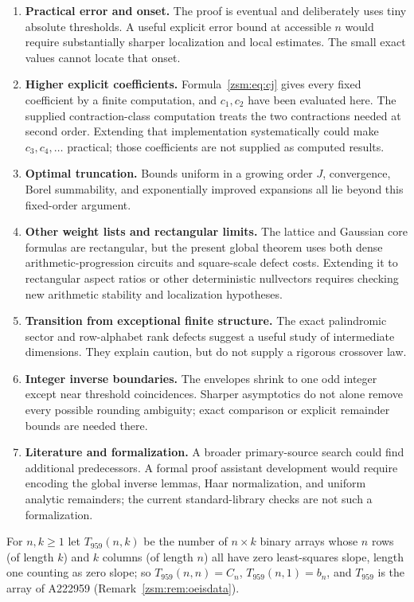\documentclass[11pt]{article}
\theoremstyle{definition}\newtheorem{definition}[theorem]{Definition}
\theoremstyle{remark}\newtheorem{remark}[theorem]{Remark}
\begin{document}
\begin{enumerate}
\item \textbf{Practical error and onset.} The proof is eventual and deliberately
uses tiny absolute thresholds. A useful explicit error bound at accessible
$n$ would require substantially sharper localization and local estimates.
The small exact values cannot locate that onset.
\item \textbf{Higher explicit coefficients.} Formula~\eqref{zsm:eq:cj} gives every
fixed coefficient by a finite computation, and $c_1,c_2$ have been evaluated
here. The supplied contraction-class computation treats the two contractions
needed at second order. Extending that implementation systematically could
make $c_3,c_4,\ldots$ practical; those coefficients are not supplied as
computed results.
\item \textbf{Optimal truncation.} Bounds uniform in a growing order $J$,
convergence, Borel summability, and exponentially improved expansions all lie
beyond this fixed-order argument.
\item \textbf{Other weight lists and rectangular limits.} The lattice and
Gaussian core formulas are rectangular, but the present global theorem uses
both dense arithmetic-progression circuits and square-scale defect costs.
Extending it to rectangular aspect ratios or other deterministic nullvectors
requires checking new arithmetic stability and localization hypotheses.
\item \textbf{Transition from exceptional finite structure.} The exact
palindromic sector and row-alphabet rank defects suggest a useful study of
intermediate dimensions. They explain caution, but do not supply a rigorous
crossover law.
\item \textbf{Integer inverse boundaries.} The envelopes shrink to one odd
integer except near threshold coincidences. Sharper asymptotics do not alone
remove every possible rounding ambiguity; exact comparison or explicit
remainder bounds are needed there.
\item \textbf{Literature and formalization.} A broader primary-source search
could find additional predecessors. A formal proof assistant development
would require encoding the global inverse lemmas, Haar normalization, and
uniform analytic remainders; the current standard-library checks are not
such a formalization.
\end{enumerate}

For $n,k\ge1$ let $T_{959}(n,k)$ be the number of $n\times k$ binary arrays
whose $n$ rows (of length $k$) and $k$ columns (of length $n$) all have zero
least-squares slope, length one counting as zero slope; so
$T_{959}(n,n)=C_n$, $T_{959}(n,1)=b_n$, and $T_{959}$ is the array of
A222959 (Remark~\ref{zsm:rem:oeisdata}).
\end{document}
